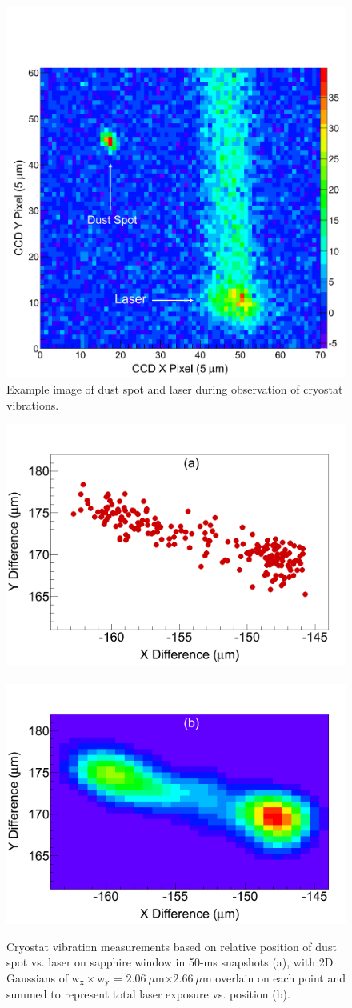 \begin{figure} %
        \centering
                \includegraphics[width=.6\textwidth]{figures/image_dustspot.png}
                \caption{Example image of dust spot and laser during observation of cryostat vibrations.}
\label{fig:dustspot}
\end{figure}

\begin{figure} %
        \centering
                \includegraphics[width=.5\textwidth]{figures/cryovibes_a.png}
                ~
                \includegraphics[width=.5\textwidth]{figures/cryovibes_b.png}
                \caption{Cryostat vibration measurements based on relative position of dust spot vs. laser on sapphire window in 50-ms snapshots (a), with 2D Gaussians of w$_{\text{x}} \times $w$_{\text{y}}$ = $2.06~\mu$m$ \times 2.66~\mu$m overlain on each point and summed to represent total laser exposure vs. position (b).}
\label{fig:cryovibe2D}
\end{figure}

